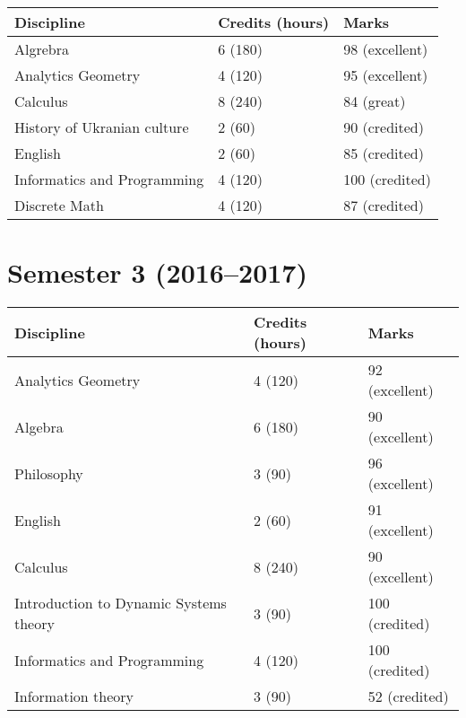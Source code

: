 \documentclass[10pt]{extarticle}
\begin{document}
\begin{tabularx}{\textwidth}{ | X | l | l | }

\hline
    \textbf{Discipline}              & \textbf{Credits (hours)} & \textbf{Marks} \\
\hline
    Algrebra           & 6 (180) & 98 (excellent) \\
    Analytics Geometry & 4 (120) & 95 (excellent) \\
    Calculus           & 8 (240) & 84 (great)     \\
\hline
    History of Ukranian culture & 2 (60)  & 90 (credited)  \\
    English                     & 2 (60)  & 85 (credited)  \\
    Informatics and Programming & 4 (120) & 100 (credited) \\
    Discrete Math               & 4 (120) & 87 (credited)  \\
\hline

\end{tabularx}


\section*{Semester 3 (2016--2017)}

\begin{tabularx}{\textwidth}{ | X | l | l | }

\hline
    \textbf{Discipline}              & \textbf{Credits (hours)} & \textbf{Marks} \\
\hline
    Analytics Geometry & 4 (120) & 92 (excellent) \\
    Algebra            & 6 (180) & 90 (excellent) \\
    Philosophy         & 3 (90)  & 96 (excellent) \\
    English            & 2 (60)  & 91 (excellent) \\
    Calculus           & 8 (240) & 90 (excellent) \\
\hline
    Introduction to Dynamic Systems theory & 3 (90)  & 100 (credited) \\
    Informatics and Programming            & 4 (120) & 100 (credited) \\
    Information theory                     & 3 (90)  & 52 (credited)  \\
\hline

\end{tabularx}
\end{document}
